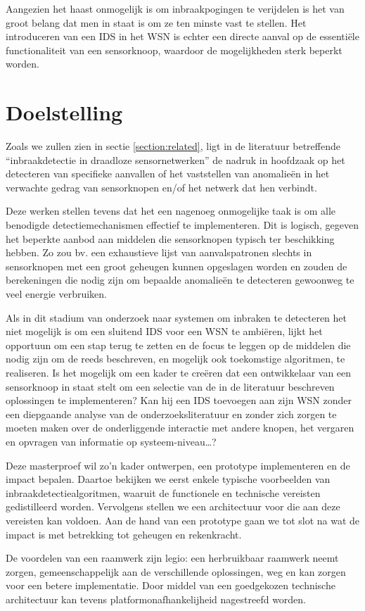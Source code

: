 Aangezien het haast onmogelijk is om inbraakpogingen te verijdelen is het van
groot belang dat men in staat is om ze ten minste vast te stellen. Het
introduceren van een IDS in het WSN is echter een directe aanval op de
essenti\"ele functionaliteit van een sensorknoop, waardoor de mogelijkheden
sterk beperkt worden.

\section{Doelstelling}
\label{section:doelstelling}

Zoals we zullen zien in sectie \ref{section:related}, ligt in de literatuur
betreffende ``inbraakdetectie in draadloze sensornetwerken'' de nadruk in
hoofdzaak op het detecteren van specifieke aanvallen of het vaststellen van
anomalie\"en in het verwachte gedrag van sensorknopen en/of het netwerk dat hen
verbindt.

Deze werken stellen tevens dat het een nagenoeg onmogelijke taak is om alle
benodigde detectiemechanismen effectief te implementeren. Dit is logisch,
gegeven het beperkte aanbod aan middelen die sensorknopen typisch ter
beschikking hebben. Zo zou bv. een exhaustieve lijst van aanvalspatronen
slechts in sensorknopen met een groot geheugen kunnen opgeslagen worden en
zouden de berekeningen die nodig zijn om bepaalde anomalie\"en te detecteren
gewoonweg te veel energie verbruiken.

Als in dit stadium van onderzoek naar systemen om inbraken te detecteren het
niet mogelijk is om een sluitend IDS voor een WSN te ambi\"eren, lijkt het
opportuun om een stap terug te zetten en de focus te leggen op de middelen die
nodig zijn om de reeds beschreven, en mogelijk ook toekomstige algoritmen, te
realiseren. Is het mogelijk om een kader te cre\"eren dat een ontwikkelaar van
een sensorknoop in staat stelt om een selectie van de in de literatuur
beschreven oplossingen te implementeren? Kan hij een IDS toevoegen aan zijn WSN
zonder een diepgaande analyse van de onderzoeksliteratuur en zonder zich zorgen
te moeten maken over de onderliggende interactie met andere knopen, het
vergaren en opvragen van informatie op systeem-niveau\dots?

Deze masterproef wil zo'n kader ontwerpen, een prototype implementeren en de
impact bepalen. Daartoe bekijken we eerst enkele typische voorbeelden van
inbraakdetectiealgoritmen, waaruit de functionele en technische vereisten
gedistilleerd worden. Vervolgens stellen we een architectuur voor die aan deze
vereisten kan voldoen. Aan de hand van een prototype gaan we tot slot na wat de
impact is met betrekking tot geheugen en rekenkracht.

De voordelen van een raamwerk zijn legio: een herbruikbaar raamwerk neemt
zorgen, gemeenschappelijk aan de verschillende oplossingen, weg en kan zorgen
voor een betere implementatie. Door middel van een goedgekozen technische
architectuur kan tevens platformonafhankelijheid nagestreefd worden.
